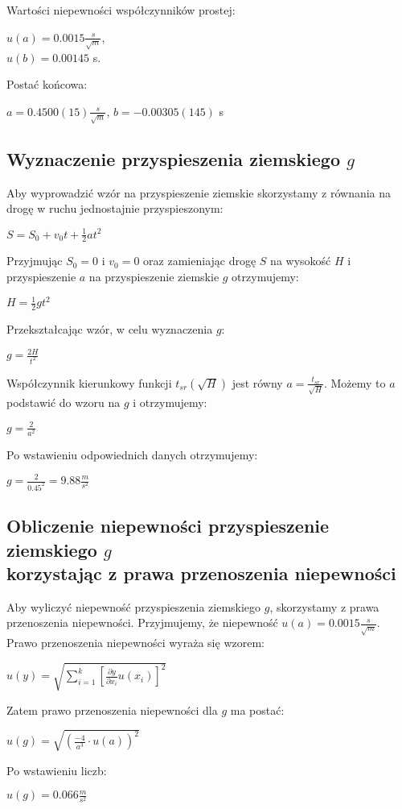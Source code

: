 \documentclass[12pt]{article}
\begin{document}
\begin{flushleft}
    Wartości niepewności współczynników prostej:
\end{flushleft}

\begin{center}
    $u(a) = 0.0015 \frac{s}{\sqrt{m}}$, \\
    $u(b) = 0.00145$ s.
\end{center}
Postać końcowa:
\begin{center}
    $a = 0.4500(15)\frac{s}{\sqrt{m}}$, $b = -0.00305(145)$ s
\end{center}
\subsection*{Wyznaczenie przyspieszenia ziemskiego $g$}

Aby wyprowadzić wzór na przyspieszenie ziemskie skorzystamy z równania na drogę
w ruchu jednostajnie przyspieszonym:
\begin{center}
    $ S = S_{0} + v_{0}t + \frac{1}{2}at^2$
\end{center}
Przyjmując $S_{0} = 0$ i $v_{0} = 0$ oraz zamieniając drogę $S$ na wysokość $H$
i przyspieszenie $a$ na przyspieszenie ziemskie $g$ otrzymujemy:
\begin{center}
    $H = \frac{1}{2}gt^2$
\end{center}
Przekształcając wzór, w celu wyznaczenia $g$:
\begin{center}
    $g = \frac{2H}{t^2}$
\end{center}
Współczynnik kierunkowy funkcji $t_{sr}(\sqrt{H})$ jest równy $a =
    \frac{t_{sr}}{\sqrt{H}}$. Możemy to $a$ podstawić do wzoru na $g$ i
otrzymujemy:
\begin{center}
    $g = \frac{2}{a^2}$
\end{center}
Po wstawieniu odpowiednich danych otrzymujemy:
\begin{center}
    $g = \frac{2}{0.45^2} = 9.88 \frac{m}{s^2}$
\end{center}

\subsection*{Obliczenie niepewności przyspieszenie ziemskiego $g$ \\
    korzystając z prawa przenoszenia niepewności}

Aby wyliczyć niepewność przyspieszenia ziemskiego $g$, skorzystamy z prawa
przenoszenia niepewności. Przyjmujemy, że niepewność $u(a) = 0.0015
    \frac{s}{\sqrt{m}}$. Prawo przenoszenia niepewności wyraża się wzorem:
\begin{center}
    $u(y) = \sqrt{\sum_{i=1}^{k}[\frac{\partial y}{\partial x_i}u(x_i)]^2}$
\end{center}
Zatem prawo przenoszenia niepewności dla $g$ ma postać:
\begin{center}
    $u(g) = \sqrt{(\frac{-4}{a^3} \cdot u(a))^2}$
\end{center}
Po wstawieniu liczb:
\begin{center}
    $u(g) = 0.066 \frac{m}{s^2}$
\end{center}
\end{document}
